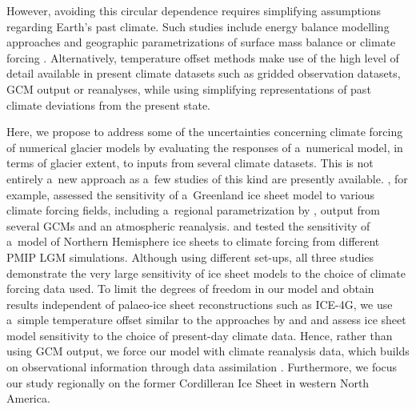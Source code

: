 \documentclass[tc, ms]{copernicus}
\begin{document}
However, avoiding this circular dependence requires simplifying assumptions regarding Earth's past climate. Such studies include energy balance modelling approaches \citep{tarasov-peltier-1997} and geographic parametrizations of surface mass balance \citep{robert-1991} or climate forcing \citep{johnson-fastook-2002}. Alternatively, temperature offset methods \citep{greve-etal-1999,bintanja-etal-2005} make use of the high level of detail available in present climate datasets such as gridded observation datasets, GCM output or reanalyses, while using simplifying representations of past climate deviations from the present state.

Here, we propose to address some of the uncertainties concerning climate forcing of numerical glacier models by evaluating the responses of a~numerical model, in terms of glacier extent, to inputs from several climate datasets. This is not entirely a~new approach as a~few studies of this kind are presently available. \citet{quiquet-etal-2012}, for example, assessed the sensitivity of a~Greenland ice sheet model to various climate forcing fields, including a~regional parametrization by \citet{fausto-etal-2009a}, output from several GCMs and an atmospheric reanalysis. \citet{rodgers-etal-2004} and \citet{charbit-etal-2007} tested the sensitivity of a~model of Northern Hemisphere ice sheets to climate forcing from different PMIP LGM simulations. Although using different set-ups, all three studies demonstrate the very large sensitivity of ice sheet models to the choice of climate forcing data used. To limit the degrees of freedom in our model and obtain results independent of palaeo-ice sheet reconstructions such as ICE-4G, we use a~simple temperature offset similar to the approaches by \citet{greve-etal-1999} and \citet{bintanja-etal-2005} and assess ice sheet model sensitivity to the choice of present-day climate data. Hence, rather than using GCM output, we force our model with climate reanalysis data, which builds on observational information through data assimilation \citep{bengtsson-etal-2007}. Furthermore, we focus our study regionally on the former Cordilleran Ice Sheet in western North America.
\end{document}
